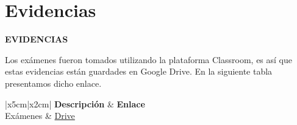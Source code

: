 \clearpage
{}
\vspace*{\fill}
{\centering
	\section{Evidencias}}
\vspace*{\fill}

\clearpage


{\centering \textbf{EVIDENCIAS}}

\begin{flushleft}
	Los exámenes fueron tomados utilizando la plataforma Classroom, es así que estas evidencias están guardades en Google Drive. En la siguiente tabla presentamos dicho enlace.	
\end{flushleft}

\begin{table}[H]
	\centering
	\caption{Evidencias de los exámenes.}
	\begin{tabular}{|x{5cm}|x{2cm}|}
		\hline 
		\textbf{Descripción} & \textbf{Enlace} \\ \hline
		Exámenes & \href{https://drive.google.com/drive/folders/0B4QL7QHQ91XKfnZyVE5wekFLZFAwVGZQS0Fkc1dvQ3N5cDhrQklTOTVSS08zZFVqSk83ZjA?usp=sharing}{Drive} \\ 
		\hline 
	\end{tabular}
\end{table}







% 

% 
% 

% 
% 
% 



